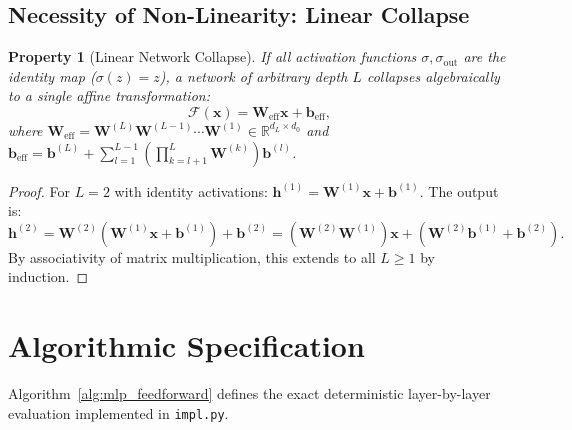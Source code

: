 \documentclass[11pt]{article}
\newtheorem{property}{Property}
\begin{document}
\subsection{Necessity of Non-Linearity: Linear Collapse}

\begin{property}[Linear Network Collapse]
If all activation functions $\sigma, \sigma_{\text{out}}$ are the identity map ($\sigma(z) = z$), a network of arbitrary depth $L$ collapses algebraically to a single affine transformation:
\begin{equation}
\mathcal{F}(\mathbf{x}) = \mathbf{W}_{\text{eff}} \mathbf{x} + \mathbf{b}_{\text{eff}},
\end{equation}
where $\mathbf{W}_{\text{eff}} = \mathbf{W}^{(L)} \mathbf{W}^{(L-1)} \cdots \mathbf{W}^{(1)} \in \mathbb{R}^{d_L \times d_0}$ and $\mathbf{b}_{\text{eff}} = \mathbf{b}^{(L)} + \sum_{l=1}^{L-1} \left( \prod_{k=l+1}^L \mathbf{W}^{(k)} \right) \mathbf{b}^{(l)}$.
\end{property}
\begin{proof}
For $L=2$ with identity activations: $\mathbf{h}^{(1)} = \mathbf{W}^{(1)} \mathbf{x} + \mathbf{b}^{(1)}$. The output is:
$$\mathbf{h}^{(2)} = \mathbf{W}^{(2)} (\mathbf{W}^{(1)} \mathbf{x} + \mathbf{b}^{(1)}) + \mathbf{b}^{(2)} = (\mathbf{W}^{(2)} \mathbf{W}^{(1)}) \mathbf{x} + (\mathbf{W}^{(2)} \mathbf{b}^{(1)} + \mathbf{b}^{(2)}).$$
By associativity of matrix multiplication, this extends to all $L \ge 1$ by induction.
\end{proof}

\section{Algorithmic Specification}
\label{sec:algorithm}

Algorithm~\ref{alg:mlp_feedforward} defines the exact deterministic layer-by-layer evaluation implemented in \texttt{impl.py}.
\end{document}
